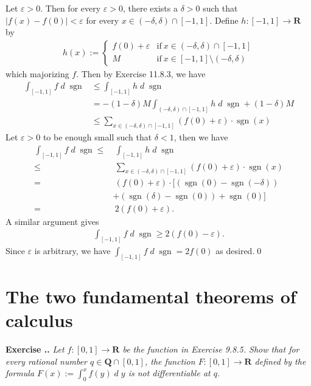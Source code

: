 \documentclass{book}
\DeclareMathOperator{\sgn}{sgn}
\DeclareMathOperator{\dd}{\mathit{d}}
\newcounter{Exercise}[section]
\renewcommand{\theExercise}{\thesection.\arabic{Exercise}.}
\newcommand{\new}{\vspace{1.5em}\noindent\textbf{{Exercise \stepcounter{Exercise}\textbf{\theExercise}}} }
\begin{document}
Let $\varepsilon > 0$. Then for every $\varepsilon > 0$, there exists a $\delta > 0$ such that $|f(x) - f(0)| < \varepsilon$ for every $x \in (-\delta, \delta) \cap [-1, 1]$. Define $h : [-1, 1] \to \mathbf{R}$ by
    \begin{align*}
        h(x) := \left\{\begin{array}{ll}
            f(0) + \varepsilon  &\text{if}\ x \in (-\delta, \delta) \cap [-1, 1]\\
            M   &\text{if}\ x \in [-1, 1] \setminus (-\delta, \delta)
        \end{array}\right.
    \end{align*}
which majorizing $f$. Then by Exercise 11.8.3, we have
    \begin{align*}
        \int_{[-1, 1]} f \dd\sgn
        &\leq \int_{[-1, 1]} h \dd\sgn\\
        &= -(1-\delta)M \int_{(-\delta, \delta) \cap [-1, 1]} h \dd\sgn + (1-\delta)M\\
        &\leq \sum_{x \in (-\delta, \delta) \cap [-1, 1]} (f(0) + \varepsilon)\cdot\sgn(x)
    \end{align*}
Let $\varepsilon > 0$ to be enough small such that $\delta < 1$, then we have
    \begin{align*}
        \int_{[-1, 1]} f \dd\sgn
        \leq&~ \int_{[-1, 1]} h \dd\sgn\\
        \leq&~ \sum_{x \in (-\delta, \delta) \cap [-1, 1]} (f(0) + \varepsilon)\cdot\sgn(x)\\
        =&~ (f(0) + \varepsilon) \cdot [(\sgn(0) - \sgn(-\delta))\\
        &+ (\sgn(\delta) - \sgn(0)) + \sgn(0)]\\
        =&~ 2(f(0) + \varepsilon).
    \end{align*}
A similar argument gives
    \begin{align*}
        \int_{[-1, 1]} f \dd\sgn
        \geq 2(f(0) - \varepsilon).
    \end{align*}
Since $\varepsilon$ is arbitrary, we have $\int_{[-1, 1]} f \dd\sgn = 2f(0)$ as desired.\qed

\section{The two fundamental theorems of calculus}

\new\emph{Let $f: [0, 1] \to \mathbf{R}$ be the function in Exercise 9.8.5. Show that for every rational number $q \in \mathbf{Q} \cap [0, 1]$, the function $F : [0, 1] \to \mathbf{R}$ defined by the formula $F(x) := \int_{0}^{x} f(y) \dd y$ is not differentiable at $q$.}
\end{document}
